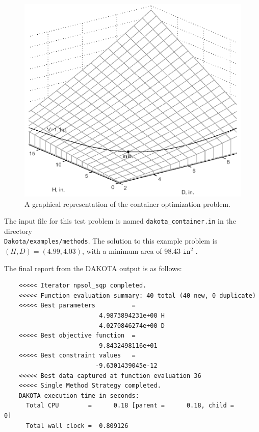 \begin{figure}
  \centering
  \includegraphics[scale=0.5]{images/graphical_container_opt}
  \caption{A graphical representation of the container optimization
    problem.}
  \label{additional:figure02}
\end{figure}

The input file for this test problem is named
\texttt{dakota\_container.in} in the directory \\
\texttt{Dakota/examples/methods}.  The solution to this example
problem is $(H,D)=(4.99,4.03)$, with a minimum area of 98.43
$\mathtt{in}^2$ .

The final report from the DAKOTA output is as follows:
\begin{small}
\begin{verbatim}
    <<<<< Iterator npsol_sqp completed.
    <<<<< Function evaluation summary: 40 total (40 new, 0 duplicate)
    <<<<< Best parameters          =
                          4.9873894231e+00 H
                          4.0270846274e+00 D
    <<<<< Best objective function  =
                          9.8432498116e+01
    <<<<< Best constraint values   =
                         -9.6301439045e-12
    <<<<< Best data captured at function evaluation 36
    <<<<< Single Method Strategy completed.
    DAKOTA execution time in seconds:
      Total CPU        =      0.18 [parent =      0.18, child =         0]
      Total wall clock =  0.809126
\end{verbatim}
\end{small}

